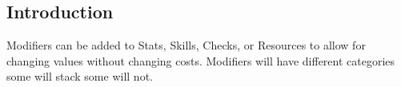 
\subsection{Introduction}
\Glspl{Modifier} can be added to \glspl{Stat}, \glspl{Skill},
\glspl{Check}, or \glspl{Resource} to allow for changing values
without changing costs. \Glspl{Modifier} will have different
categories some will stack some will not.
